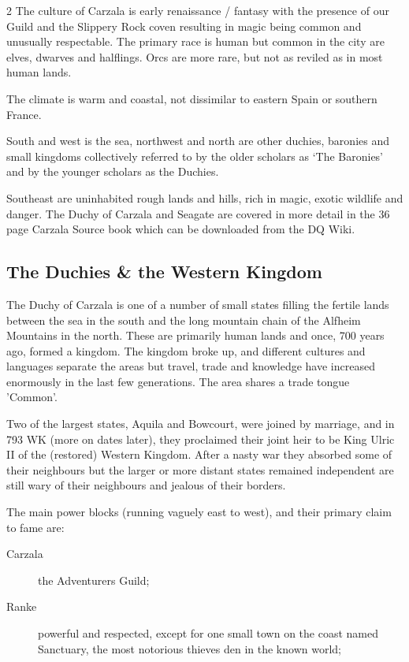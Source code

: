 \begin{multicols}{2}
The culture of Carzala is early renaissance / fantasy with the
presence of our Guild and the Slippery Rock coven resulting in magic
being common and unusually respectable. The primary race is human but
common in the city are elves, dwarves and halflings. Orcs are more
rare, but not as reviled as in most human lands.

The climate is warm and coastal, not dissimilar to eastern Spain or
southern France.

South and west is the sea, northwest and north are other duchies,
baronies and small kingdoms collectively referred to by the older
scholars as ‘The Baronies’ and by the younger scholars as the Duchies.

Southeast are uninhabited rough lands and hills, rich in magic, exotic
wildlife and danger.  The Duchy of Carzala and Seagate are covered in
more detail in the 36 page Carzala Source book which can be downloaded
from the DQ Wiki.

\subsection{The Duchies \& the Western Kingdom}

The Duchy of Carzala is one of a number of small states filling the
fertile lands between the sea in the south and the long mountain chain
of the Alfheim Mountains in the north.  These are primarily human
lands and once, 700 years ago, formed a kingdom. The kingdom broke up,
and different cultures and languages separate the areas but travel,
trade and knowledge have increased enormously in the last few
generations. The area shares a trade tongue 'Common'.

Two of the largest states, Aquila and Bowcourt, were joined by
marriage, and in 793 WK (more on dates later), they proclaimed their
joint heir to be King Ulric II of the (restored) Western Kingdom.
After a nasty war they absorbed some of their neighbours but the
larger or more distant states remained independent are still wary of
their neighbours and jealous of their borders.

The main power blocks (running vaguely east to west), and their
primary claim to fame are:
\begin{description}
\item[Carzala] the Adventurers Guild;

\item[Ranke] powerful and respected, except for one small town on the
  coast named Sanctuary, the most notorious thieves den in the known
  world;


\end{description}
\end{multicols}
